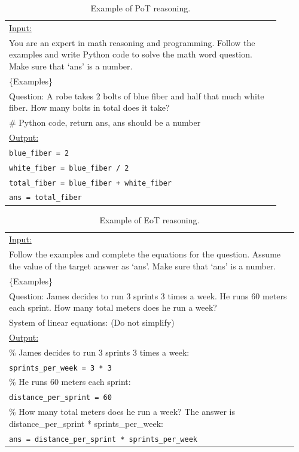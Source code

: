 \documentclass[10pt]{article} %
\begin{document}
  \begin{table}[t]
    \caption{Example of PoT reasoning.}
    \label{tab:pot-reasoning}
    \begin{center}
    \begin{tabular}{|p{0.9\linewidth}|}
    \hline
    \underline{Input:}\\
    You are an expert in math reasoning and programming. Follow the examples and write Python code to solve the math word question. Make sure that `ans' is a number. \\
    \{Examples\} \\
    Question: A robe takes 2 bolts of blue fiber and half that much white fiber. How many bolts in total does it take? \\
    \# Python code, return ans, ans should be a number \\
    \hline
    \underline{Output:} \\
    \texttt{blue\_fiber = 2} \\
    \texttt{white\_fiber = blue\_fiber / 2} \\
    \texttt{total\_fiber = blue\_fiber + white\_fiber} \\
    \texttt{ans = total\_fiber} \\
    \hline
    \end{tabular}
    \end{center}
    \end{table}
    
    \begin{table}[t]
      \caption{Example of EoT reasoning.}
      \label{tab:eot-reasoning}
      \begin{center}
      \begin{tabular}{|p{0.96\linewidth}|}
      \hline
      \underline{Input:}\\
      Follow the examples and complete the equations for the question. Assume the value of the target answer as `ans'. Make sure that `ans' is a number. \\
      \{Examples\} \\
      Question: James decides to run 3 sprints 3 times a week. He runs 60 meters each sprint. How many total meters does he run a week? \\
      System of linear equations: (Do not simplify) \\
      \hline
      \underline{Output:} \\
      \% James decides to run 3 sprints 3 times a week: \\
      \texttt{sprints\_per\_week = 3 * 3} \\
      \% He runs 60 meters each sprint: \\
      \texttt{distance\_per\_sprint = 60} \\
      \% How many total meters does he run a week? The answer is distance\_per\_sprint * sprints\_per\_week: \\
      \texttt{ans = distance\_per\_sprint * sprints\_per\_week} \\
      \hline
      \end{tabular}
      \end{center}
      \end{table}
      
\end{document}
